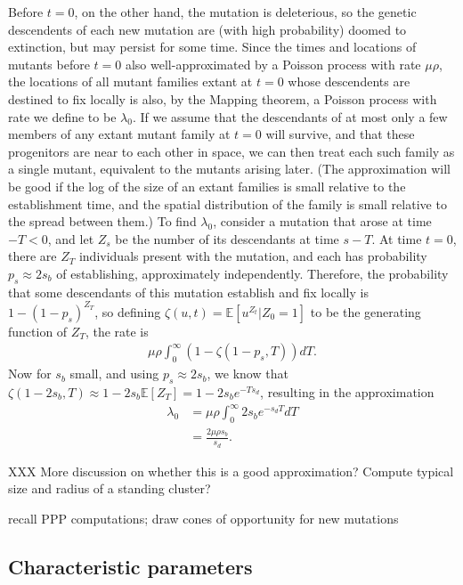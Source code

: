 \documentclass{article}
\newcommand{\E}{\mathbb{E}}
\begin{document}
Before $t=0$, on the other hand, the mutation is deleterious, so the genetic descendents of each new mutation are (with high probability) doomed to extinction,
but may persist for some time.
Since the times and locations of mutants before $t=0$ also well-approximated by a Poisson process with rate $\mu \rho$,
the locations of all mutant families extant at $t=0$ whose descendents are destined to fix locally is also,
by the Mapping theorem, a Poisson process with rate we define to be $\lambda_0$.
If we assume that the descendants of at most only a few members of any extant mutant family at $t=0$ will survive,
and that these progenitors are near to each other in space, we can then treat each such family as a single mutant,
equivalent to the mutants arising later.
(The approximation will be good if the log of the size of an extant families is small relative to the establishment time,
and the spatial distribution of the family is small relative to the spread between them.)
To find $\lambda_0$, consider a mutation that arose at time $-T<0$, and let $Z_s$ be the number of its descendants at time $s-T$.
At time $t=0$, there are $Z_T$ individuals present with the mutation,
and each has probability $p_s \approx 2s_b$ of establishing, approximately independently.
Therefore, the probability that some descendants of this mutation establish and fix locally is $1-(1-p_s)^{Z_T}$,
so defining $\zeta(u,t) = \E[u^{Z_t} | Z_0=1 ]$ to be the generating function of $Z_T$,
the rate is
\begin{align*}
    \mu \rho \int_0^\infty \left( 1- \zeta(1-p_s,T) \right) dT .
\end{align*}
Now for $s_b$ small, and using $p_s \approx 2s_b$,
we know that $\zeta(1-2s_b,T) \approx 1-2s_b \E[Z_T] = 1-2s_b e^{-Ts_d}$,
resulting in the approximation
\begin{align}
    \lambda_0 &= \mu \rho \int_0^\infty 2s_b e^{-s_d T} dT \\
        &= \frac{ 2 \mu \rho s_b }{ s_d } .
\end{align}

XXX More discussion on whether this is a good approximation?  
Compute typical size and radius of a standing cluster?

recall PPP computations; draw cones of opportunity for new mutations 

\subsection{Characteristic parameters}
\end{document}
